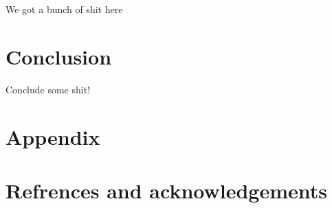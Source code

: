 \documentclass[norsk,a4paper,12pt]{article}
\begin{document}
We got a bunch of shit here

\section{Conclusion} %
\label{sec:conclusion}

Conclude some shit!



\section{Appendix} %
\label{sec:appendix}


\section{Refrences and acknowledgements} %
\label{sec:refrences_and_acknowledgements}

\end{document}
